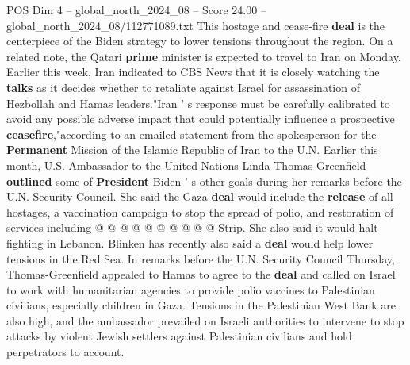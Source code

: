 \begin{textsample}{POS Dim 4 – global\_north\_2024\_08 – Score 24.00 – global\_north\_2024\_08/112771089.txt}
This hostage and cease-fire \textbf{deal} is the centerpiece of the Biden strategy to lower tensions throughout the region.
On a related note, the Qatari \textbf{prime} minister is expected to travel to Iran on Monday.
Earlier this week, Iran indicated to CBS News that it is closely watching the \textbf{talks} as it decides whether to retaliate against Israel for assassination of Hezbollah and Hamas leaders."Iran ' s response must be carefully calibrated to avoid any possible adverse impact that could potentially influence a prospective \textbf{ceasefire},"according to an emailed statement from the spokesperson for the \textbf{Permanent} Mission of the Islamic Republic of Iran to the U.N.
Earlier this month, U.S.
Ambassador to the United Nations Linda Thomas-Greenfield \textbf{outlined} some of \textbf{President} Biden ' s other goals during her remarks before the U.N.
Security Council.
She said the Gaza \textbf{deal} would include the \textbf{release} of all hostages, a vaccination campaign to stop the spread of polio, and restoration of services including @ @ @ @ @ @ @ @ @ @ Strip.
She also said it would halt fighting in Lebanon.
Blinken has recently also said a \textbf{deal} would help lower tensions in the Red Sea.
In remarks before the U.N.
Security Council Thursday, Thomas-Greenfield appealed to Hamas to agree to the \textbf{deal} and called on Israel to work with humanitarian agencies to provide polio vaccines to Palestinian civilians, especially children in Gaza.
Tensions in the Palestinian West Bank are also high, and the ambassador prevailed on Israeli authorities to intervene to stop attacks by violent Jewish settlers against Palestinian civilians and hold perpetrators to account.

\end{textsample}
